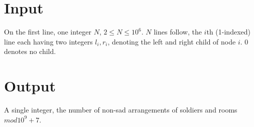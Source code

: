 \section*{Input}
On the first line, one integer $N$, $2 \leq N \leq 10^6$.
$N$ lines follow, the $i$th (1-indexed) line each having two integers $l_i, r_i$, denoting the left and right child of node $i$. $0$ denotes no child.

\section*{Output}
A single integer, the number of non-sad arrangements of soldiers and rooms $mod 10^9 + 7$.
